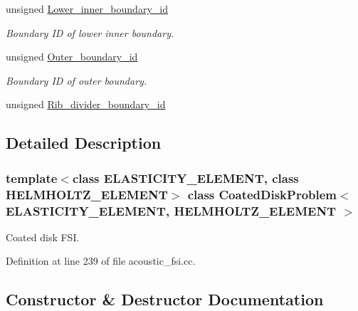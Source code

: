 \begin{DoxyCompactItemize}
unsigned \hyperlink{classCoatedDiskProblem_a693be7a3e4c968c52d5c19d9a35a05b3}{Lower\+\_\+inner\+\_\+boundary\+\_\+id}
\begin{DoxyCompactList}\small\item\em Boundary ID of lower inner boundary. \end{DoxyCompactList}\item 
unsigned \hyperlink{classCoatedDiskProblem_acdffaaa300e0c67b5ceb7c85925a46f0}{Outer\+\_\+boundary\+\_\+id}
\begin{DoxyCompactList}\small\item\em Boundary ID of outer boundary. \end{DoxyCompactList}\item 
unsigned \hyperlink{classCoatedDiskProblem_a0f241ef5043d002c90d68a93831e9212}{Rib\+\_\+divider\+\_\+boundary\+\_\+id}
\end{DoxyCompactItemize}


\subsection{Detailed Description}
\subsubsection*{template$<$class E\+L\+A\+S\+T\+I\+C\+I\+T\+Y\+\_\+\+E\+L\+E\+M\+E\+NT, class H\+E\+L\+M\+H\+O\+L\+T\+Z\+\_\+\+E\+L\+E\+M\+E\+NT$>$\newline
class Coated\+Disk\+Problem$<$ E\+L\+A\+S\+T\+I\+C\+I\+T\+Y\+\_\+\+E\+L\+E\+M\+E\+N\+T, H\+E\+L\+M\+H\+O\+L\+T\+Z\+\_\+\+E\+L\+E\+M\+E\+N\+T $>$}

Coated disk F\+SI. 

Definition at line 239 of file acoustic\+\_\+fsi.\+cc.



\subsection{Constructor \& Destructor Documentation}
\mbox{\label{classCoatedDiskProblem_a9585ca5b422c72dc2b91cbb3e311b736}} 
